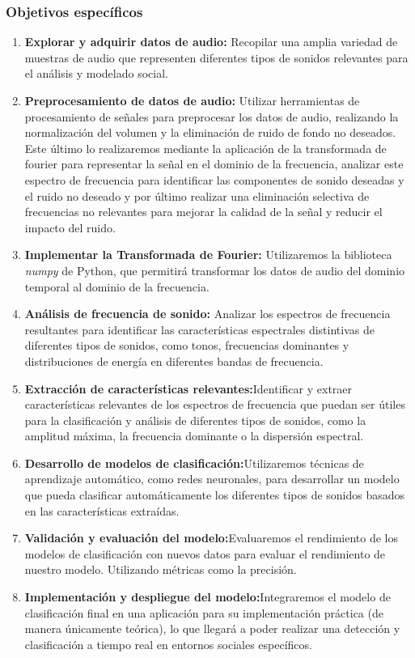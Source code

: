 \subsubsection{Objetivos específicos}
\begin{enumerate}
    \item \textbf{Explorar y adquirir datos de audio:} Recopilar una amplia variedad de muestras de audio que representen diferentes tipos de sonidos relevantes para el análisis y modelado social.
    \item \textbf{Preprocesamiento de datos de audio:} Utilizar herramientas de procesamiento de señales para preprocesar los datos de audio, realizando la normalización del volumen y la eliminación de ruido de fondo no deseados. Este último lo realizaremos mediante la aplicación de la transformada de fourier para representar la señal en el dominio de la frecuencia, analizar este espectro de frecuencia para identificar las componentes de sonido deseadas y el ruido no deseado y por último realizar una eliminación selectiva de frecuencias no relevantes para mejorar la calidad de la señal y reducir el impacto del ruido.
    \item \textbf{Implementar la Transformada de Fourier:} Utilizaremos la biblioteca \textit{numpy} de Python, que permitirá transformar los datos de audio del dominio temporal al dominio de la frecuencia.
    \item \textbf{Análisis de frecuencia de sonido:} Analizar los espectros de frecuencia resultantes para identificar las características espectrales distintivas de diferentes tipos de sonidos, como tonos, frecuencias dominantes y distribuciones de energía en diferentes bandas de frecuencia.
    \item \textbf{Extracción de características relevantes:}Identificar y extraer características relevantes de los espectros de frecuencia que puedan ser útiles para la clasificación y análisis de diferentes tipos de sonidos, como la amplitud máxima, la frecuencia dominante o  la dispersión espectral.
    \item \textbf{Desarrollo de modelos de clasificación:}Utilizaremos técnicas de aprendizaje automático, como redes neuronales, para desarrollar un modelo que pueda clasificar automáticamente los diferentes tipos de sonidos basados en las características extraídas.
    \item \textbf{Validación y evaluación del modelo:}Evaluaremos el rendimiento de los modelos de clasificación con nuevos datos para evaluar el rendimiento de nuestro modelo.  Utilizando métricas como la precisión.
    \item \textbf{Implementación y despliegue del modelo:}Integraremos el modelo de clasificación final en una aplicación para su implementación práctica (de manera únicamente teórica), lo que llegará a poder realizar una detección y clasificación a tiempo real en entornos sociales específicos.
\end{enumerate}
